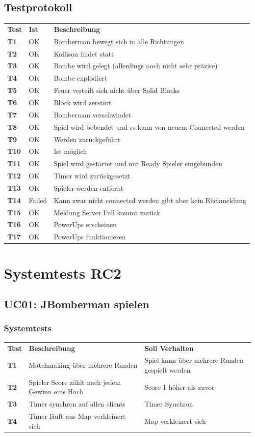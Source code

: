 \documentclass[11pt]{scrartcl}
\begin{document}
\subsection{Testprotokoll}
\begin{tabularx}{\linewidth}{l l X}
  \bf{Test} & \bf{Ist} & \bf{Beschreibung} \\
  \bf{T1} & OK & Bomberman bewegt sich in alle Richtungen\\
  \bf{T2} & OK &  Kollison findet statt\\
  \bf{T3} & OK  & Bombe wird gelegt (allerdings noch nicht sehr präzise)\\
  \bf{T4} & OK &  Bombe explodiert\\
  \bf{T5} & OK & Feuer verteilt sich nicht über Solid Blocks\\
  \bf{T6} & OK &  Block wird zerstört\\
  \bf{T7} & OK & Bomberman verschwindet\\
  \bf{T8} & OK & Spiel wird bebendet und es kann von neuem Connected werden\\
  \bf{T9} & OK & Werden zurückgeführt\\
  \bf{T10} & OK & Ist möglich\\
  \bf{T11} & OK& Spiel wird gestartet und nur Ready Spieler eingebunden\\
  \bf{T12} & OK &  Timer wird zurückgesetzt\\
  \bf{T13} & OK &  Spieler werden entfernt\\
  \bf{T14} & Failed & Kann zwar nicht connected werden gibt aber kein Rückmeldung \\
  \bf{T15} & OK & Meldung Server Full kommt zurück\\
  \bf{T16} & OK & PowerUps erscheinen\\
  \bf{T17} & OK & PowerUps funktionieren\\
\end{tabularx}

\section{Systemtests RC2}
\subsection{UC01: JBomberman spielen}
\subsubsection{Systemtests}
\begin{tabularx}{\linewidth}{l X X}
  \bf{Test} & \bf{Beschreibung} & \bf{Soll Verhalten} \\
 \bf{T1} & Matchmaking über mehrere Runden & Spiel kann über mehrere 
 Runden gespielt werden \\
 \bf{T2} & Spieler Score zählt nach jedem Gewinn eins Hoch & Score 1 höher als 
 zuvor \\
 \bf{T3} & Timer synchron auf allen clients & Timer Synchron \\
 \bf{T4} & Timer läuft aus Map verkleinert sich & Map verkleinert sich \\
 
 \end{tabularx}
\end{document}
